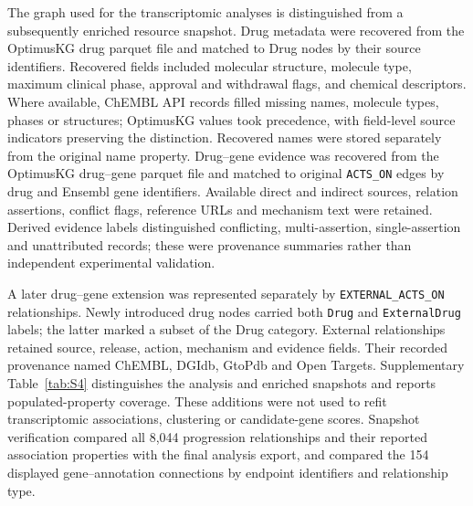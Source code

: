 The graph used for the transcriptomic analyses is distinguished from a subsequently enriched resource snapshot. Drug metadata were recovered from the OptimusKG drug parquet file and matched to Drug nodes by their source identifiers. Recovered fields included molecular structure, molecule type, maximum clinical phase, approval and withdrawal flags, and chemical descriptors. Where available, ChEMBL API records filled missing names, molecule types, phases or structures; OptimusKG values took precedence, with field-level source indicators preserving the distinction. Recovered names were stored separately from the original name property. Drug--gene evidence was recovered from the OptimusKG drug--gene parquet file and matched to original \texttt{ACTS\_ON} edges by drug and Ensembl gene identifiers. Available direct and indirect sources, relation assertions, conflict flags, reference URLs and mechanism text were retained. Derived evidence labels distinguished conflicting, multi-assertion, single-assertion and unattributed records; these were provenance summaries rather than independent experimental validation.

A later drug--gene extension was represented separately by \texttt{EXTERNAL\_ACTS\_ON} relationships. Newly introduced drug nodes carried both \texttt{Drug} and \texttt{ExternalDrug} labels; the latter marked a subset of the Drug category. External relationships retained source, release, action, mechanism and evidence fields. Their recorded provenance named ChEMBL, DGIdb, GtoPdb and Open Targets. Supplementary Table~\ref{tab:S4} distinguishes the analysis and enriched snapshots and reports populated-property coverage. These additions were not used to refit transcriptomic associations, clustering or candidate-gene scores. Snapshot verification compared all 8,044 progression relationships and their reported association properties with the final analysis export, and compared the 154 displayed gene--annotation connections by endpoint identifiers and relationship type.

